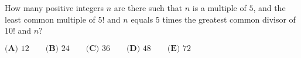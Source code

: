 How many positive integers $n$ are there such that $n$ is a multiple of $5$, and the least common multiple of $5!$ and $n$ equals $5$ times the greatest common divisor of $10!$ and $n?$

$\textbf{(A) } 12 \qquad \textbf{(B) } 24 \qquad \textbf{(C) } 36 \qquad \textbf{(D) } 48 \qquad \textbf{(E) } 72$
